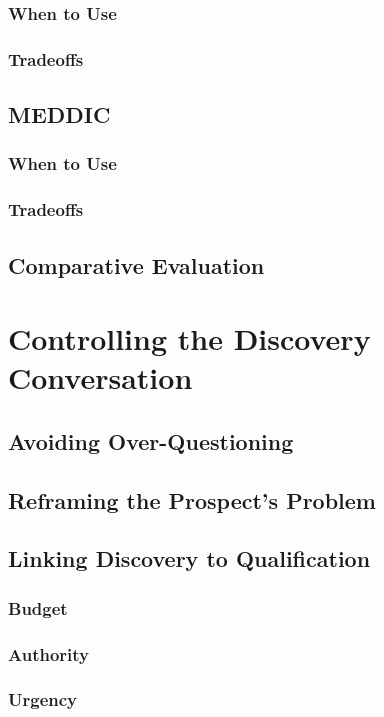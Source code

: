         \subsubsection{When to Use}\mbox{}
        \subsubsection{Tradeoffs}\mbox{}
    \subsection{MEDDIC}\mbox{}
        \subsubsection{When to Use}\mbox{}
        \subsubsection{Tradeoffs}\mbox{}
    \subsection{Comparative Evaluation}\mbox{}

\section{Controlling the Discovery Conversation}\mbox{}
    \subsection{Avoiding Over-Questioning}\mbox{}
    \subsection{Reframing the Prospect's Problem}\mbox{}
    \subsection{Linking Discovery to Qualification}\mbox{}
        \subsubsection{Budget}\mbox{}
        \subsubsection{Authority}\mbox{}
        \subsubsection{Urgency}\mbox{}

\printbibliography[heading=secbibliography, title={References}]